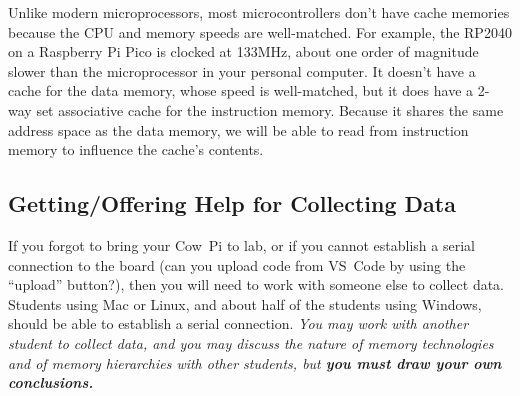 Unlike modern microprocessors, most microcontrollers don't have cache
memories because the CPU and memory speeds are well-matched.
For example, the RP2040 on a Raspberry Pi Pico is clocked at 133MHz, about one order of magnitude slower than the microprocessor in your personal computer.
It doesn't have a cache for the data memory, whose speed is well-matched,
but it does have a 2-way set associative cache for the instruction memory.
Because it shares the same address space as the data memory, we will be able to read from instruction memory to influence the cache's contents.

%


\subsection{Getting/Offering Help for Collecting Data}

If you forgot to bring your Cow~Pi to lab, or if you cannot establish a serial connection to the board (can you upload code from VS~Code by using the ``upload'' button?),
then you will need to work with someone else to collect data.
Students using Mac or Linux, and about half of the students using Windows, should be able to establish a serial connection.
\textit{You may work with another student to collect data, and you may discuss the nature of memory technologies and of memory hierarchies with other students, but \textbf{you must draw your own conclusions.}}

